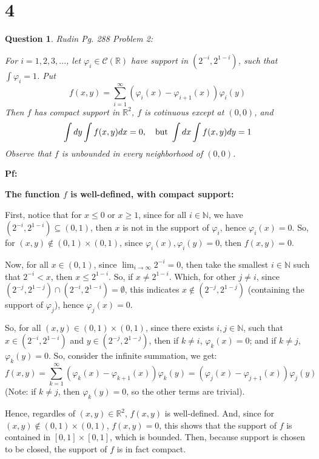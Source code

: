 \documentclass{article}
\newtheorem{question}{Question}
\begin{document}
\break

\section*{4}
\begin{myBox}[]{}
    \begin{question}
        Rudin Pg. 288 Problem 2:

        For $i=1,2,3,...$, let $\varphi_i\in \mathcal{C}(\mathbb{R})$ have support in $(2^{-i},2^{1-i})$, such that $\int\varphi_i=1$. Put 
        $$f(x,y)=\sum_{i=1}^{\infty}(\varphi_i(x)-\varphi_{i+1}(x))\varphi_i(y)$$
        Then $f$ has compact support in $\mathbb{R}^2$, $f$ is cotinuous except at $(0,0)$, and 
        $$\int dy\int f(x,y)dx = 0,\quad \textmd{but } \int dx\int f(x,y)dy = 1$$
        Observe that $f$ is unbounded in every neighborhood of $(0,0)$.
    \end{question}
\end{myBox}

\textbf{Pf:}

\textbf{The function $f$ is well-defined, with compact support:}

First, notice that for $x\leq 0$ or $x\geq 1$, since for all $i\in\mathbb{N}$, we have $(2^{-i},2^{1-i})\subseteq (0,1)$, then $x$ is not in the support of $\varphi_i$, hence $\varphi_i(x)=0$. So, for $(x,y)\notin (0,1)\times (0,1)$, since $\varphi_i(x),\varphi_i(y)=0$, then $f(x,y)=0$. 

\hfil

Now, for all $x\in (0,1)$, since $\lim_{i\rightarrow\infty}2^{-i}=0$, then take the smallest $i\in\mathbb{N}$ such that $2^{-i}<x$, then $x\leq 2^{1-i}$. So, if $x\neq 2^{1-i}$. Which, for other $j\neq i$, since $(2^{-j},2^{1-j})\cap (2^{-i},2^{1-i})=\emptyset$, this indicates $x\notin (2^{-j},2^{1-j})$ (containing the support of $\varphi_j$), hence $\varphi_j(x)=0$.

So, for all $(x,y)\in (0,1)\times (0,1)$, since there exists $i,j\in\mathbb{N}$, such that $x\in (2^{-i},2^{1-i})$ and $y\in (2^{-j},2^{1-j})$, then if $k\neq i$, $\varphi_k(x)=0$; and if $k\neq j$, $\varphi_k(y)=0$. So, consider the infinite summation, we get:
$$f(x,y) = \sum_{k=1}^{\infty}(\varphi_k(x)-\varphi_{k+1}(x))\varphi_k(y) = (\varphi_j(x)-\varphi_{j+1}(x))\varphi_j(y)$$
(Note: if $k\neq j$, then $\varphi_k(y)=0$, so the other terms are trivial).

Hence, regardles of $(x,y)\in\mathbb{R}^2$, $f(x,y)$ is well-defined. And, since for $(x,y)\notin (0,1)\times (0,1)$, $f(x,y)=0$, this shows that the support of $f$ is contained in $[0,1]\times [0,1]$, which is bounded. Then, because support is chosen to be closed, the support of $f$ is in fact compact.
\end{document}
